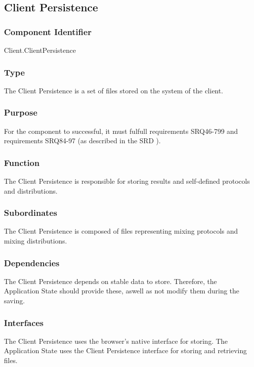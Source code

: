 \subsection{Client Persistence}

\subsubsection*{Component Identifier}
Client.ClientPersistence

\subsubsection*{Type}
The Client Persistence is a set of files stored on the system of the client.

\subsubsection*{Purpose}
For the component to successful, it must fulfull requirements SRQ46-799 and requirements SRQ84-97 (as described in the SRD \cite{srd}).

\subsubsection*{Function}
The Client Persistence is responsible for storing results and self-defined protocols and distributions.

\subsubsection*{Subordinates}
The Client Persistence is composed of files representing mixing protocols and mixing distributions.

\subsubsection*{Dependencies}
The Client Persistence depends on stable data to store. Therefore, the Application State should provide these, aswell as not modify them during the saving.

\subsubsection*{Interfaces}
The Client Persistence uses the browser's native interface for storing. The Application State uses the Client Persistence interface for storing and retrieving files.

